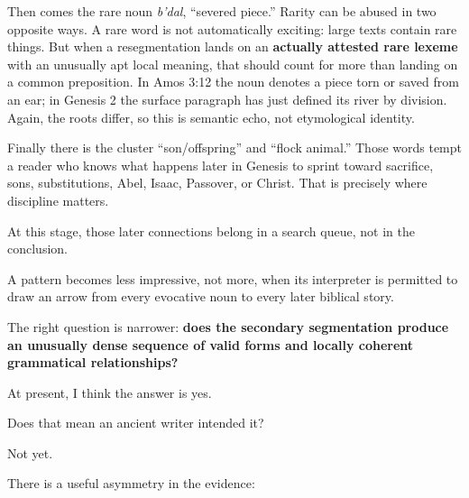Then comes the rare noun \textit{b'dal}, ``severed piece.'' Rarity can be abused in two opposite ways. A rare word is not automatically exciting: large texts contain rare things. But when a resegmentation lands on an \textbf{actually attested rare lexeme} with an unusually apt local meaning, that should count for more than landing on a common preposition. In Amos 3:12 the noun denotes a piece torn or saved from an ear; in Genesis 2 the surface paragraph has just defined its river by division. Again, the roots differ, so this is semantic echo, not etymological identity.\cite{BDB,MasoreticGenesis}

Finally there is the cluster ``son/offspring'' and ``flock animal.'' Those words tempt a reader who knows what happens later in Genesis to sprint toward sacrifice, sons, substitutions, Abel, Isaac, Passover, or Christ. That is precisely where discipline matters.

At this stage, those later connections belong in a search queue, not in the conclusion.

A pattern becomes less impressive, not more, when its interpreter is permitted to draw an arrow from every evocative noun to every later biblical story.

The right question is narrower: \textbf{does the secondary segmentation produce an unusually dense sequence of valid forms and locally coherent grammatical relationships?}

At present, I think the answer is yes.

Does that mean an ancient writer intended it?

Not yet.

There is a useful asymmetry in the evidence:

